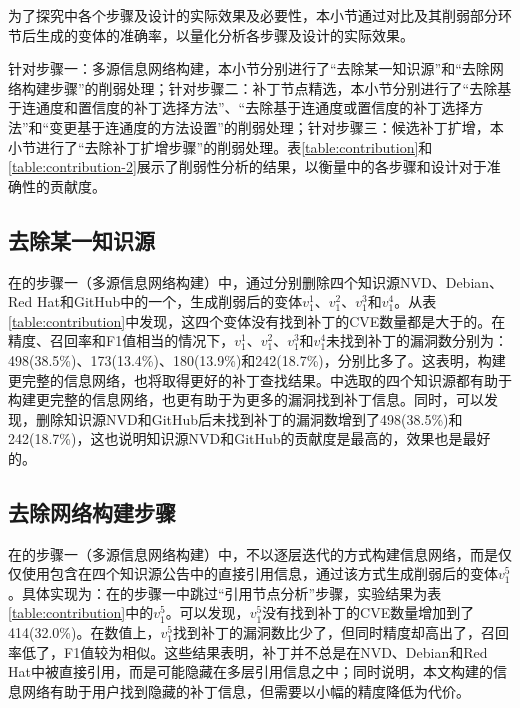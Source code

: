为了探究\tool 中各个步骤及设计的实际效果及必要性，本小节通过对比\tool 及其削弱部分环节后生成的变体的准确率，以量化分析各步骤及设计的实际效果。

针对步骤一：多源信息网络构建，本小节分别进行了“去除某一知识源”和“去除网络构建步骤”的削弱处理；针对步骤二：补丁节点精选，本小节分别进行了“去除基于连通度和置信度的补丁选择方法”、“去除基于连通度或置信度的补丁选择方法”和“变更基于连通度的方法设置”的削弱处理；针对步骤三：候选补丁扩增，本小节进行了“去除补丁扩增步骤”的削弱处理。表\ref{table:contribution}和\ref{table:contribution-2}展示了削弱性分析的结果，以衡量\tool 中的各步骤和设计对于准确性的贡献度。

\subsection{去除某一知识源} 
在\tool 的步骤一（多源信息网络构建）中，通过分别删除四个知识源NVD、Debian、Red Hat和GitHub中的一个，生成削弱后的变体$v_1^1$、$v_1^2$、$v_1^3$和$v_1^4$。从表\ref{table:contribution}中发现，这四个变体没有找到补丁的CVE数量都是大于\tool 的。在精度、召回率和F1值相当的情况下，$v_1^1$、$v_1^2$、$v_1^3$和$v_1^4$未找到补丁的漏洞数分别为：498(38.5\%)、173(13.4\%)、180(13.9\%)和242(18.7\%)，分别比\tool 多了。这表明，构建更完整的信息网络，也将取得更好的补丁查找结果。\tool 中选取的四个知识源都有助于构建更完整的信息网络，也更有助于为更多的漏洞找到补丁信息。同时，可以发现，删除知识源NVD和GitHub后未找到补丁的漏洞数增到了498(38.5\%)和242(18.7\%)，这也说明知识源NVD和GitHub的贡献度是最高的，效果也是最好的。

\subsection{去除网络构建步骤}
在\tool 的步骤一（多源信息网络构建）中，不以逐层迭代的方式构建信息网络，而是仅仅使用包含在四个知识源公告中的直接引用信息，通过该方式生成削弱后的变体$v_1^5$。具体实现为：在\tool 的步骤一中跳过“引用节点分析”步骤，实验结果为表\ref{table:contribution}中的$v_1^5$。可以发现，$v_1^5$没有找到补丁的CVE数量增加到了414(32.0\%)。在数值上，$v_1^5$找到补丁的漏洞数比\tool 少了，但同时精度却高出了，召回率低了，F1值较为相似。这些结果表明，补丁并不总是在NVD、Debian和Red Hat中被直接引用，而是可能隐藏在多层引用信息之中；同时说明，本文构建的信息网络有助于用户找到隐藏的补丁信息，但需要以小幅的精度降低为代价。


